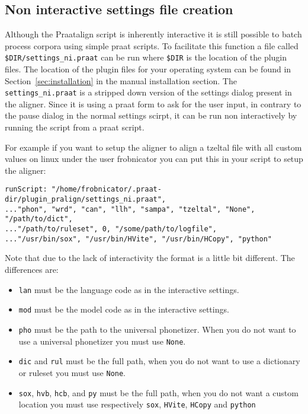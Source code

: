 \subsection{Non interactive settings file creation}
Although the Praatalign script is inherently interactive it is still possible
to batch process corpora using simple praat scripts. To facilitate this
function a file called \texttt{\$DIR/settings\_ni.praat} can be run where
\texttt{\$DIR} is the location of the plugin files. The location of the plugin
files for your operating system can be found in Section~\ref{sec:installation}
in the manual installation section. The \texttt{settings\_ni.praat} is a
stripped down version of the settings dialog present in the aligner. Since it
is using a praat form to ask for the user input, in contrary to the pause
dialog in the normal settings scirpt, it can be run non interactively by
running the script from a praat script.

For example if you want to setup the aligner to align a tzeltal file with all
custom values on linux under the user frobnicator you can put this in your
script to setup the aligner:

\begin{lstlisting}
runScript: "/home/frobnicator/.praat-dir/plugin_pralign/settings_ni.praat",
..."phon", "wrd", "can", "llh", "sampa", "tzeltal", "None", "/path/to/dict",
..."/path/to/ruleset", 0, "/some/path/to/logfile",
..."/usr/bin/sox", "/usr/bin/HVite", "/usr/bin/HCopy", "python"
\end{lstlisting}

Note that due to the lack of interactivity the format is a little bit
different. The differences are:
\begin{itemize}
	\item \texttt{lan} must be the language code as in the interactive settings.
	\item \texttt{mod} must be the model code as in the interactive settings.
	\item \texttt{pho} must be the path to the universal phonetizer. When you do
not want to use a universal phonetizer you must use \texttt{None}.
	\item \texttt{dic} and \texttt{rul} must be the full path, when you do not
want to use a dictionary or ruleset you must use \texttt{None}.
	\item \texttt{sox}, \texttt{hvb}, \texttt{hcb}, and \texttt{py} must be the
full path, when you do not want a custom location you must use respectively
\texttt{sox}, \texttt{HVite}, \texttt{HCopy} and \texttt{python}
\end{itemize}

